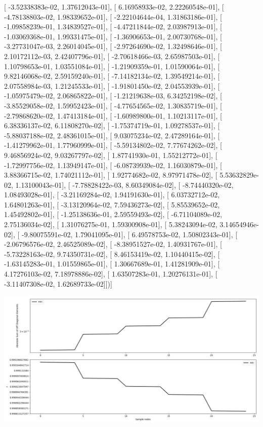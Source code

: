 \documentclass{article}
\begin{document}
       [ -3.52338383e-02,   1.37612043e-01],
       [  6.16958933e-02,   2.22260548e-01],
       [ -4.78138803e-02,   1.98339652e-01],
       [ -2.22104644e-04,   1.31863186e-01],
       [ -1.09858239e-01,   1.34839527e-01],
       [ -4.47211844e-02,   2.03987913e-01],
       [ -1.03069368e-01,   1.99331475e-01],
       [ -1.36906653e-01,   2.00730768e-01],
       [ -3.27731047e-03,   2.26014045e-01],
       [ -2.97264690e-02,   1.32498646e-01],
       [  2.10172112e-03,   2.42407796e-01],
       [ -2.70618466e-03,   2.65987503e-01],
       [  1.10798653e-01,   1.03551084e-01],
       [ -1.21909359e-01,   1.01590064e-01],
       [  9.82146068e-02,   2.59159240e-01],
       [ -7.14182134e-02,   1.39549214e-01],
       [  2.07558984e-03,   1.21245533e-01],
       [ -1.91801450e-02,   2.04553939e-01],
       [ -1.05975479e-02,   2.06865822e-01],
       [ -1.21219638e-03,   6.34252198e-02],
       [ -3.85529058e-02,   1.59952423e-01],
       [ -4.77654565e-02,   1.30835719e-01],
       [ -2.79868620e-02,   1.47413184e-01],
       [ -1.60989800e-01,   1.10213117e-01],
       [  6.38336137e-02,   6.11808270e-02],
       [ -1.75374719e-01,   1.09278537e-01],
       [ -5.88037188e-02,   2.48361015e-01],
       [  9.03075234e-02,   2.47289164e-01],
       [ -1.41279962e-01,   1.77960999e-01],
       [ -5.59134802e-02,   7.77674262e-02],
       [  9.46856924e-02,   9.03267797e-02],
       [  1.87741930e-01,   1.55212772e-01],
       [ -1.72997756e-02,   1.13949147e-01],
       [ -6.08739939e-02,   1.16030879e-01],
       [  3.88366715e-02,   1.74021112e-01],
       [  1.92774682e-02,   8.97971478e-02],
       [  5.53632829e-02,   1.13100043e-01],
       [ -7.78828422e-03,   8.60349084e-02],
       [ -8.74440320e-02,   1.08493028e-01],
       [ -3.21169284e-02,   1.94191630e-01],
       [  6.03732712e-02,   1.64801263e-01],
       [ -3.13120964e-02,   7.59436273e-02],
       [  5.85539652e-02,   1.45492802e-01],
       [ -1.25138636e-01,   2.59559493e-02],
       [ -6.71104089e-02,   2.75136034e-02],
       [  1.31076275e-01,   1.59300908e-01],
       [  5.38243094e-02,   3.14654946e-02],
       [ -9.80075591e-02,   1.79041095e-01],
       [  6.49578753e-02,   1.50802343e-01],
       [ -2.06796576e-02,   2.46525089e-02],
       [ -8.38951527e-02,   1.40931767e-01],
       [ -5.73228163e-02,   9.74350731e-02],
       [  8.46153419e-02,   1.10440415e-02],
       [ -1.63145283e-01,   1.01559865e-01],
       [  1.30667689e-01,   1.41281909e-01],
       [  4.17276103e-02,   7.18978886e-02],
       [  1.63507283e-01,   1.20276131e-01],
       [ -3.11407308e-02,   1.62689733e-02]])]
\begin{center}
\includegraphics[scale=.9]{report_pickled_controls190/control_dpn_all.png}

\end{center}
\end{document}
